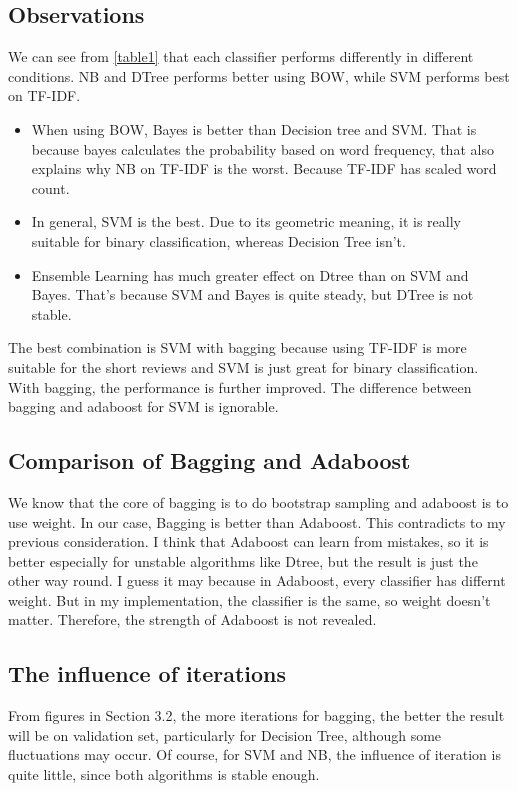 \documentclass[paper=a4, fontsize=11pt, UTF8]{article} %
\begin{document}
\subsection{Observations}
We can see from \ref{table1} that each classifier performs differently in different conditions. NB and DTree performs better using BOW, while SVM performs best on TF-IDF. 
\begin{itemize}
    \item When using BOW, Bayes is better than Decision tree and SVM. That is because bayes calculates the probability based on word frequency, that also explains why NB on TF-IDF is the worst. Because TF-IDF has scaled word count.
    \item In general, SVM is the best. Due to its geometric meaning, it is really suitable for binary classification, whereas Decision Tree isn't.
    \item Ensemble Learning has much greater effect on Dtree than on SVM and Bayes. That's because SVM and Bayes is quite steady, but DTree is not stable.
\end{itemize}

The best combination is SVM with bagging because using TF-IDF is more suitable for the short reviews and SVM is just great for binary classification. With bagging, the performance is further improved. The difference between bagging and adaboost for SVM is ignorable.

\subsection{Comparison of Bagging and Adaboost}
We know that the core of bagging is to do bootstrap sampling and adaboost is to use weight. In our case, Bagging is better than Adaboost. This contradicts to my previous consideration. I think that Adaboost can learn from mistakes, so it is better especially for unstable algorithms like Dtree, but the result is just the other way round. I guess it may because in Adaboost, every classifier has differnt weight. But in my implementation, the classifier is the same, so weight doesn't matter. Therefore, the strength of Adaboost is not revealed.

\subsection{The influence of iterations}
From figures in Section 3.2, the more iterations for bagging, the better the result will be on validation set, particularly for Decision Tree, although some fluctuations may occur. Of course, for SVM and NB, the influence of iteration is quite little, since both algorithms is stable enough.
\end{document}
